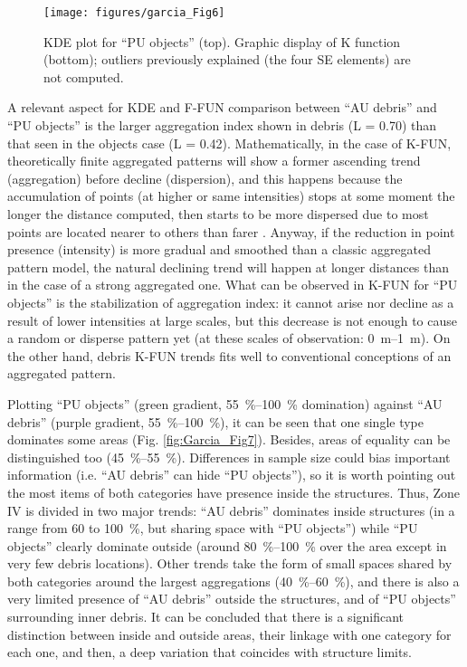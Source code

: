 \begin{figure}
	\texttt{[image: figures/garcia\_Fig6]}
	\centering
	\caption{KDE plot for “PU objects” (top). Graphic display of K function (bottom); outliers previously explained (the four SE elements) are not computed.}
	\label{fig:Garcia_Fig6}
\end{figure}

A relevant aspect for KDE and F-FUN comparison between “AU debris” and “PU objects” is the larger aggregation index shown in debris (L = 0.70) than that seen in the objects case (L = 0.42). Mathematically, in the case of K-FUN, theoretically finite aggregated patterns will show a former ascending trend (aggregation) before decline (dispersion), and this happens because the accumulation of points (at higher or same intensities) stops at some moment the longer the distance computed, then starts to be more dispersed due to most points are located nearer to others than farer \parencite{Maximiano_2008}. Anyway, if the reduction in point presence (intensity) is more gradual and smoothed than a classic aggregated pattern model, the natural declining trend will happen at longer distances than in the case of a strong aggregated one. What can be observed in K-FUN for “PU objects” is the stabilization of aggregation index: it cannot arise nor decline as a result of lower intensities at large scales, but this decrease is not enough to cause a random or disperse pattern yet (at these scales of observation: \SIrange{0}{1}{\metre}). On the other hand, debris K-FUN trends fits well to conventional conceptions of an aggregated pattern. 

Plotting “PU objects” (green gradient, \SIrange{55}{100}{\percent} domination) against “AU debris” (purple gradient, \SIrange{55}{100}{\percent}), it can be seen that one single type dominates some areas (Fig. \ref{fig:Garcia_Fig7}). Besides, areas of equality can be distinguished too (\SIrange{45}{55}{\percent}). 
Differences in sample size could bias important information (i.e. “AU debris” can hide “PU objects”), so it is worth pointing out the most items of both categories have presence inside the structures. Thus, Zone IV is divided in two major trends: “AU debris” dominates inside structures (in a range from 60 to \SI{100}{\percent}, but sharing space with “PU objects”) while “PU objects” clearly dominate outside (around \SIrange{80}{100}{\percent} over the area except in very few debris locations). 
Other trends take the form of small spaces shared by both categories around the largest aggregations (\SIrange{40}{60}{\percent}), and there is also a very limited presence of “AU debris” outside the structures, 
and of “PU objects” surrounding inner debris. It can be concluded that there is a significant distinction between inside and outside areas, their linkage with one category for each one, and then, a deep variation that coincides with structure limits.
 
